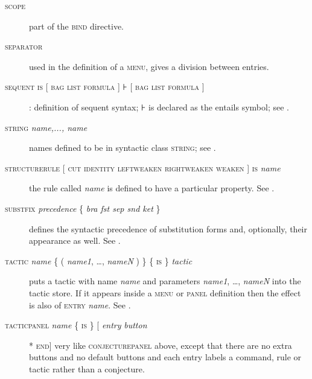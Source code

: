 \begin{description}
\item[\textsc{scope}] part of the \textsc{bind} directive.

\item[\textsc{separator}] used in the definition of a \textsc{menu}, gives a division between entries. %

\item[\textsc{sequent is} {[} \textsc{bag} {\textbar} \textsc{list} {\textbar} \textsc{formula} {]} ⊦ {[} \textsc{bag} {\textbar} \textsc{list} {\textbar} \textsc{formula} {]}]: definition of sequent syntax; ⊦ is declared as the entails symbol; see .

\item[\textsc{string} \textit{name,..., name}] names defined to be in syntactic class \textsc{string}; see .

\item[\textsc{structurerule} {[} \textsc{cut} {\textbar} \textsc{identity} {\textbar} \textsc{leftweaken} {\textbar} \textsc{rightweaken} {\textbar} \textsc{weaken} {]} \textsc{is} \textit{name}] the rule called \textit{name} is defined to have a particular property. See .

\item[\textsc{substfix} \textit{precedence} \{ \textit{bra fst sep snd ket} \}] defines the syntactic precedence of substitution forms and, optionally, their appearance as well. See .

\item[\textsc{tactic} \textit{name} \{ ( \textit{name1}, \dots, \textit{nameN} ) \} \{ \textsc{is} \} \textit{tactic}] puts a tactic with name \textit{name} and parameters \textit{name1}, \dots, \textit{nameN} into the tactic store. If it appears inside a \textsc{menu} or \textsc{panel} definition then the effect is also of \textsc{entry} \textit{name}.%
See .

\item[\textsc{tacticpanel} \textit{name} \{ \textsc{is} \} [ \textit{entry} {\textbar} \textit{button} ]* \textsc{end}] very like \textsc{conjecturepanel} above, except that there are no extra buttons and no default buttons and each entry labels a command, rule or tactic rather than a conjecture. %


\end{description}
